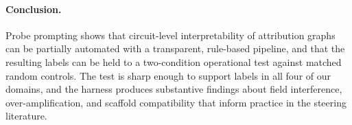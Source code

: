 


\paragraph{Conclusion.}
Probe prompting shows that circuit-level interpretability of attribution graphs can be partially automated with a transparent, rule-based pipeline, and that the resulting labels can be held to a two-condition operational test against matched random controls. The test is sharp enough to support labels in all four of our domains, and the harness produces substantive findings about field interference, over-amplification, and scaffold compatibility that inform practice in the steering literature.
